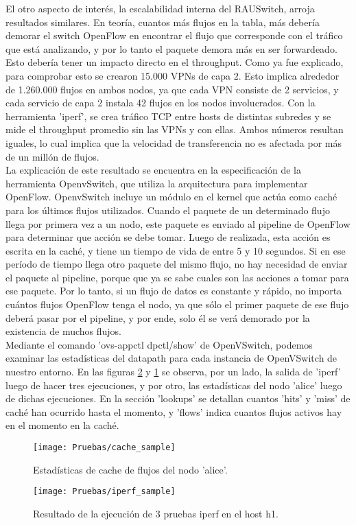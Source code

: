 El otro aspecto de interés, la escalabilidad interna del RAUSwitch, arroja resultados similares. En teoría, cuantos más flujos en la tabla, más debería demorar el switch OpenFlow en encontrar el flujo que corresponde con el tráfico que está analizando, y por lo tanto el paquete demora más en ser forwardeado. Esto debería tener un impacto directo en el throughput. Como ya fue explicado, para comprobar esto se crearon 15.000 VPNs de capa 2. Esto implica alrededor de 1.260.000 flujos en ambos nodos, ya que cada VPN consiste de 2 servicios, y cada servicio de capa 2 instala 42 flujos en los nodos involucrados. Con la herramienta 'iperf', se crea tráfico TCP entre hosts de distintas subredes y se mide el throughput promedio sin las VPNs y con ellas. Ambos números resultan iguales, lo cual implica que la velocidad de transferencia no es afectada por más de un millón de flujos.\\
La explicación de este resultado se encuentra en la especificación de la herramienta OpenvSwitch, que utiliza la arquitectura para implementar OpenFlow. OpenvSwitch incluye un módulo en el kernel que actúa como caché para los últimos flujos utilizados. Cuando el paquete de un determinado flujo llega por primera vez a un nodo, este paquete es enviado al pipeline de OpenFlow para determinar que acción se debe tomar. Luego de realizada, esta acción es escrita en la caché, y tiene un tiempo de vida de entre 5 y 10 segundos. Si en ese período de tiempo llega otro paquete del mismo flujo, no hay necesidad de enviar el paquete al pipeline, porque que ya se sabe cuales son las acciones a tomar para ese paquete. Por lo tanto, si un flujo de datos es constante y rápido, no importa cuántos flujos OpenFlow tenga el nodo, ya que sólo el primer paquete de ese flujo deberá pasar por el pipeline, y por ende, solo él se verá demorado por la existencia de muchos flujos.
\\

Mediante el comando 'ovs-appctl dpctl/show' de OpenVSwitch, podemos examinar las estadísticas del datapath para cada instancia de OpenVSwitch de nuestro entorno. En las figuras \ref{fig:iperf_sample} y \ref{fig:cache_sample} se observa, por un lado, la salida de 'iperf' luego de hacer tres ejecuciones, y por otro, las estadísticas del nodo 'alice' luego de dichas ejecuciones. En la sección 'lookups' se detallan cuantos 'hits' y 'miss' de caché han ocurrido hasta el momento, y 'flows' indica cuantos flujos activos hay en el momento en la caché.
\begin{figure}[t]
	\caption{Estadísticas de cache de flujos del nodo 'alice'.}
	\texttt{[image: Pruebas/cache\_sample]}
	\centering
	\label{fig:cache_sample}
\end{figure}

\begin{figure}[t]
	\caption{Resultado de la ejecución de 3 pruebas iperf en el host h1.}
	\texttt{[image: Pruebas/iperf\_sample]}
	\centering
	\label{fig:iperf_sample}
\end{figure}